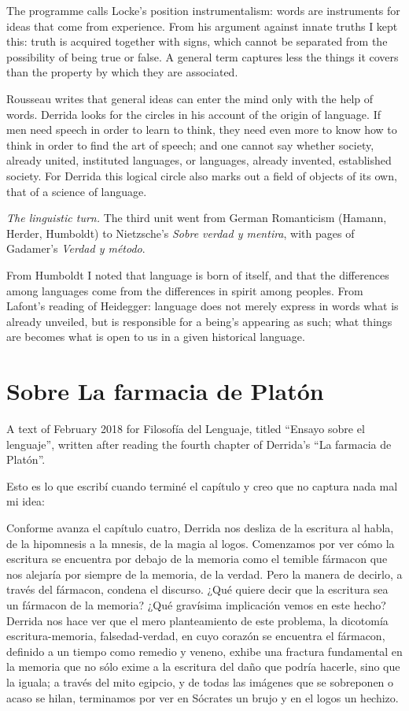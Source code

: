 The programme calls Locke's position
instrumentalism: words are instruments for
ideas that come from experience. From his
argument against innate truths I kept this:
truth is acquired together with signs, which
cannot be separated from the possibility of
being true or false. A general term captures
less the things it covers than the property
by which they are associated.

Rousseau writes that general ideas can enter
the mind only with the help of words.
Derrida looks for the circles in his account
of the origin of language. If men need
speech in order to learn to think, they need
even more to know how to think in order to
find the art of speech; and one cannot say
whether society, already united, instituted
languages, or languages, already invented,
established society. For Derrida this
logical circle also marks out a field of
objects of its own, that of a science of
language.

\medskip\noindent
\emph{The linguistic turn.}
The third unit went from German Romanticism
(Hamann, Herder, Humboldt) to Nietzsche's
\emph{Sobre verdad y mentira}, with pages of
Gadamer's \emph{Verdad y método}.

From Humboldt I noted that language is born
of itself, and that the differences among
languages come from the differences in
spirit among peoples. From Lafont's reading
of Heidegger: language does not merely
express in words what is already unveiled,
but is responsible for a being's appearing
as such; what things are becomes what is
open to us in a given historical language.

\section{Sobre La farmacia de Platón}
\label{section-farmacia-de-platon}

A text of February 2018 for Filosofía del
Lenguaje, titled ``Ensayo sobre el
lenguaje'', written after reading the
fourth chapter of Derrida's ``La farmacia
de Platón''.

Esto es lo que escribí cuando terminé el
capítulo y creo que no captura nada mal mi
idea:

Conforme avanza el capítulo cuatro, Derrida
nos desliza de la escritura al habla, de la
hipomnesis a la mnesis, de la magia al logos.
Comenzamos por ver cómo la escritura se
encuentra por debajo de la memoria como el
temible fármacon que nos alejaría por siempre
de la memoria, de la verdad. Pero la manera
de decirlo, a través del fármacon, condena el
discurso. ¿Qué quiere decir que la escritura
sea un fármacon de la memoria? ¿Qué gravísima
implicación vemos en este hecho? Derrida nos
hace ver que el mero planteamiento de este
problema, la dicotomía escritura-memoria,
falsedad-verdad, en cuyo corazón se encuentra
el fármacon, definido a un tiempo como
remedio y veneno, exhibe una fractura
fundamental en la memoria que no sólo exime a
la escritura del daño que podría hacerle,
sino que la iguala; a través del mito
egipcio, y de todas las imágenes que se
sobreponen o acaso se hilan, terminamos por
ver en Sócrates un brujo y en el logos un
hechizo.

